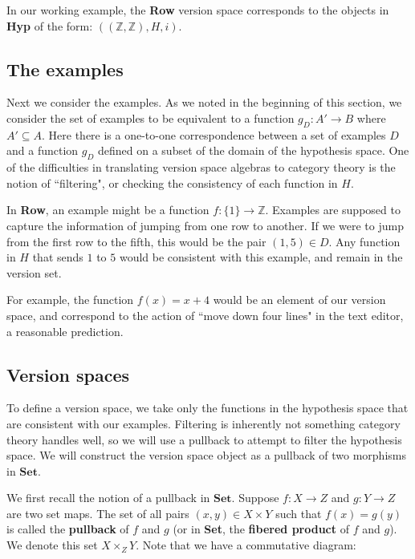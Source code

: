 \documentclass{article}
\theoremstyle{definition}
\begin{document}
In our working example, the \textbf{Row} version space corresponds to the objects in \textbf{Hyp} of the form: $((\mathbb{Z}, \mathbb{Z}), H, i)$. 


\subsection{The examples}
Next we consider the examples. As we noted in the beginning of this section, we consider the set of examples to be equivalent to a function $g_D: A' \rightarrow B$ where $A' \subseteq A$.  Here there is a one-to-one correspondence between a set of examples $D$ and a function $g_D$ defined on a subset of the domain of the hypothesis space. One of the difficulties in translating version space algebras to category theory is the notion of ``filtering", or checking the consistency of each function in $H$. 


In \textbf{Row}, an example might be a function $f: \{1\} \rightarrow \mathbb{Z}$. Examples are supposed to capture the information of jumping from one row to another. If we were to jump from the first row to the fifth, this would be the pair $(1,5)\in D$. Any function in $H$ that sends $1$ to $5$ would be consistent with this example, and remain in the version set. 

For example, the function $f(x) = x + 4$ would be an element of our version space, and correspond to the action of ``move down four lines" in the text editor, a reasonable prediction. 

\subsection{Version spaces}
To define a version space, we take only the functions in the hypothesis space that are consistent with our examples. Filtering is inherently not something category theory handles well, so we will use a pullback to attempt to filter the hypothesis space. We will construct the version space object as a pullback of two morphisms in $\textbf{Set}$. 

We first recall the notion of a pullback in $\textbf{Set}$. Suppose $f:X\rightarrow Z$ and $g:Y\rightarrow Z$ are two set maps. The set of all pairs $(x,y) \in X \times Y$ such that $f(x) = g(y)$ is called the \textbf{pullback} of $f$ and $g$ (or in \textbf{Set}, the \textbf{fibered product} of $f$ and $g$). We denote this set $X \times_Z Y$. Note that we have a commutative diagram: 
\end{document}
